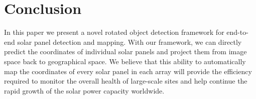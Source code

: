 \section{Conclusion}
In this paper we present a novel rotated object detection framework for end-to-end solar panel detection and mapping. With our framework, we can directly predict the coordinates of individual solar panels and project them from image space back to geographical space. We believe that this ability to automatically map the coordinates of every solar panel in each array will provide the efficiency required to monitor the overall health of large-scale sites and help continue the rapid growth of the solar power capacity worldwide.